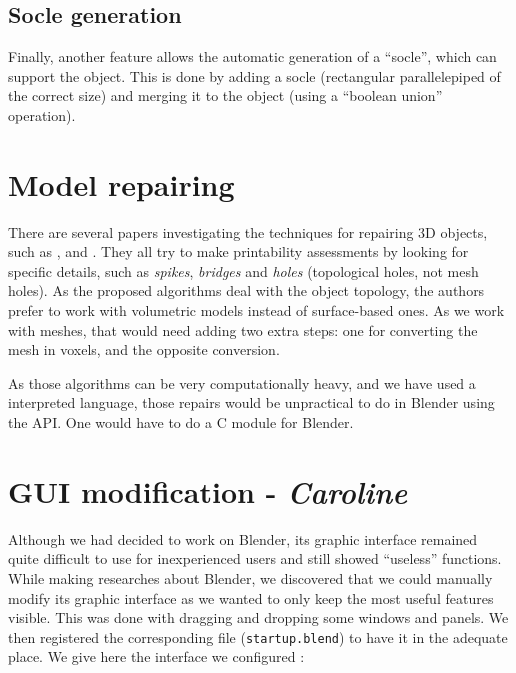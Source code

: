 \documentclass{report}
\begin{document}
\subsection{Socle generation}\label{sec:socle}
Finally, another feature allows the automatic generation of a “socle”, which can support the object. This is done by adding a socle (rectangular parallelepiped of the correct size) and merging it to the object (using a “boolean union” operation).

\section{Model repairing}\label{sec:repairing}

There are several papers investigating the techniques for repairing 3D objects, such as \cite{volum_simp}, \cite{printability} and \cite{noise_removal}. They all try to make printability assessments by looking for specific details, such as \emph{spikes}, \emph{bridges} and \emph{holes} (topological holes, not mesh holes). As the proposed algorithms deal with the object topology, the authors prefer to work with volumetric models instead of surface-based ones. As we work with meshes, that would need adding two extra steps: one for converting the mesh in voxels, and the opposite conversion.

As those algorithms can be very computationally heavy, and we have used a interpreted language, those repairs would be unpractical to do in Blender using the API. One would have to do a C module for Blender.

\section{GUI modification - \textit{Caroline}}\label{sec:gui-modif}

Although we had decided to work on Blender, its graphic interface remained quite difficult to use for inexperienced users and still showed ``useless'' functions. \\
While making researches about Blender, we discovered that we could manually modify its graphic interface as we wanted to only keep the most useful features visible. This was done with dragging and dropping some windows and panels. We then registered the corresponding file (\texttt{startup.blend}) to have it in the adequate place. We give here the interface we configured :

\bigskip
\bigskip
\end{document}
